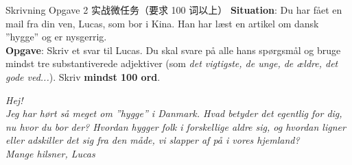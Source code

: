 \begin{emailbox}{Skrivning Opgave 2 实战微任务（要求 100 词以上）}
\textbf{Situation}: Du har fået en mail fra din ven, Lucas, som bor i Kina. Han har læst en artikel om dansk ”hygge” og er nysgerrig.\\
\textbf{Opgave}: Skriv et svar til Lucas. Du skal svare på alle hans spørgsmål og bruge mindst tre substantiverede adjektiver (som \textit{det vigtigste, de unge, de ældre, det gode ved...}). Skriv \textbf{mindst 100 ord}.

\vspace{0.3em}
\textit{Hej!\\
Jeg har hørt så meget om ”hygge” i Danmark. Hvad betyder det egentlig for dig, nu hvor du bor der? Hvordan hygger folk i forskellige aldre sig, og hvordan ligner eller adskiller det sig fra den måde, vi slapper af på i vores hjemland?\\
Mange hilsner, Lucas}
\end{emailbox}

